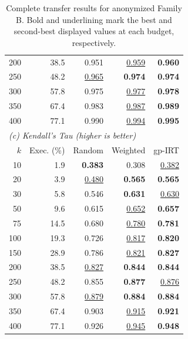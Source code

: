 \begin{table}[t]
\begin{tabular}{rrrrr}
    200 & 38.5 & 0.951 & \underline{0.959} & \textbf{0.960} \\
    250 & 48.2 & \underline{0.965} & \textbf{0.974} & \textbf{0.974} \\
    300 & 57.8 & 0.975 & \underline{0.977} & \textbf{0.978} \\
    350 & 67.4 & 0.983 & \underline{0.987} & \textbf{0.989} \\
    400 & 77.1 & 0.990 & \underline{0.994} & \textbf{0.995} \\
    \midrule
    \multicolumn{5}{l}{\textit{(c) Kendall's Tau (higher is better)}} \\
    $k$ & Exec. (\%) & Random & Weighted & gp-IRT \\
    \midrule
    10 & 1.9 & \textbf{0.383} & 0.308 & \underline{0.382} \\
    20 & 3.9 & \underline{0.480} & \textbf{0.565} & \textbf{0.565} \\
    30 & 5.8 & 0.546 & \textbf{0.631} & \underline{0.630} \\
    50 & 9.6 & 0.615 & \underline{0.652} & \textbf{0.657} \\
    75 & 14.5 & 0.680 & \underline{0.780} & \textbf{0.781} \\
    100 & 19.3 & 0.726 & \underline{0.817} & \textbf{0.820} \\
    150 & 28.9 & 0.786 & \underline{0.821} & \textbf{0.827} \\
    200 & 38.5 & \underline{0.827} & \textbf{0.844} & \textbf{0.844} \\
    250 & 48.2 & 0.855 & \textbf{0.877} & \underline{0.876} \\
    300 & 57.8 & \underline{0.879} & \textbf{0.884} & \textbf{0.884} \\
    350 & 67.4 & 0.903 & \underline{0.915} & \textbf{0.921} \\
    400 & 77.1 & 0.926 & \underline{0.945} & \textbf{0.948} \\
    \bottomrule
  \end{tabular}
  \caption{Complete transfer results for anonymized Family B. Bold and underlining mark the best and second-best displayed values at each budget, respectively.}
  \label{tab:transfer-family-b-complete}
\end{table}
